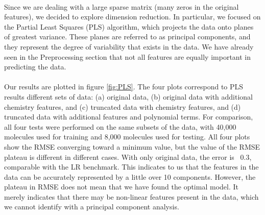 \documentclass[11pt]{article}
\begin{document}
    \paragraph{}
Since we are dealing with a large sparse matrix (many zeros in the original features), we decided to explore dimension reduction. In particular, we focused on the Partial Least Squares (PLS) algorithm, which projects the data onto planes of greatest variance. These planes are referred to as principal components, and they represent the degree of variability that exists in the data. We have already seen in the Preprocessing section that not all features are equally important in predicting the data.
\paragraph{}
Our results are plotted in figure \ref{fig:PLS}.  The four plots correspond to PLS results different sets of data: (a) original data, (b) original data with additional chemistry features, and (c) truncated data with chemistry features, and (d) truncated data with additional features and polynomial terms. For comparison, all four tests were performed on the same subsets of the data, with 40,000 molecules used for training and 8,000 molecules used for testing. 
All four plots show the RMSE converging toward a minimum value, but the value of the RMSE plateau is different in different cases. With only original data, the error is ~0.3, comparable with the LR benchmark. This indicates to us that the features in the data can be accurately represented by a little over 10 components. However, the plateau in RMSE does not mean that we have found the optimal model. It merely indicates that there may be non-linear features present in the data, which we cannot identify with a principal component analysis. 
\end{document}

